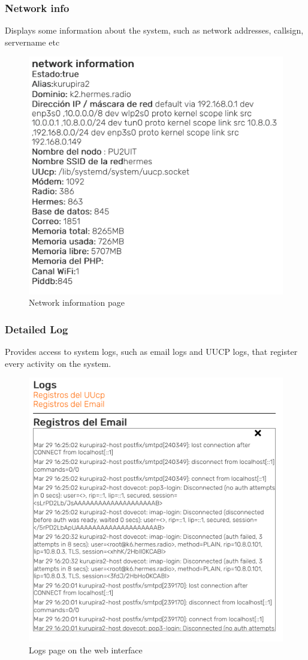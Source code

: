 \documentclass[11pt,a4paper]{article}
\begin{document}
\subsubsection{Network info} 
\label{gui_net_info}

Displays some information about the system, such as network addresses, callsign, servername etc
     \begin{figure}[H]
     \vspace{-10pt}
    \centering
    \includegraphics[width=0.5\columnwidth]{screenshots/frontend/es/networkinfo.png}
    \caption{Network information page}
    \label{fig:netinfo}
  
    \end{figure}
    
 


    
\subsubsection{Detailed Log}
Provides access to system logs, such as email logs and UUCP logs, that register every activity on the system.
    
    \begin{figure}[H]
    \centering
    \includegraphics[width=0.5\columnwidth]{screenshots/frontend/es/logs.png}
    \caption{Logs page on the web interface}
    \label{fig:logs}
\end{figure}
\end{document}
